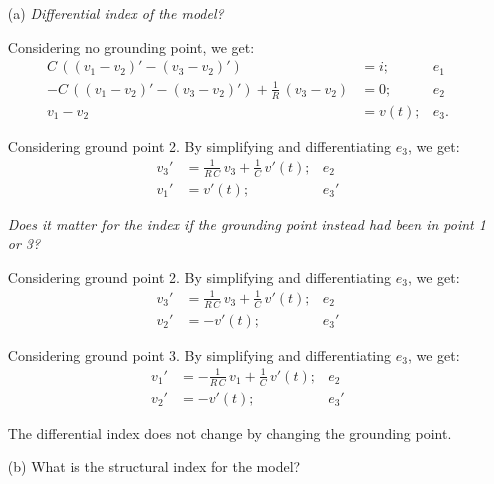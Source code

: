 \begin{enumerate}
	\item[(a)] \textit{Differential index of the model? }
	
	Considering no grounding point, we get:
	\begin{align*}
		C\,\left((v_1 - v_2)' - (v_3 - v_2)'\right) &= i;  & e_1\\
		-C\,\left((v_1 - v_2)' - (v_3 - v_2)'\right) + \frac{1}{R}\,(v_3 - v_2) &= 0;  & e_2\\
		v_1 - v_2 &= v(t);  & e_3.
	\end{align*}
	
	Considering ground point 2. By simplifying and differentiating $e_3$, we get:
	\begin{align*}
		v_3' &= \frac{1}{R\,C}\,v_3 + \frac{1}{C}\,v'(t); & e_2\\
		v_1' &= v'(t); & e_3'
	\end{align*}


	\textit{Does it matter for the index if the grounding point instead had been in point 1 or 3?} 
	
	Considering ground point 2. By simplifying and differentiating $e_3$, we get:
	\begin{align*}
		v_3' &= \frac{1}{R\,C}\,v_3 + \frac{1}{C}\,v'(t); & e_2\\
		v_2' &= -v'(t); & e_3'
	\end{align*}


	Considering ground point 3. By simplifying and differentiating $e_3$, we get:
	\begin{align*}
		v_1' &= -\frac{1}{R\,C}\,v_1 + \frac{1}{C}\,v'(t); & e_2\\
		v_2' &= -v'(t); & e_3'
	\end{align*}
	
	The differential index does not change by changing the grounding point.	

	\item[(b)] What is the structural index for the model?
	

\end{enumerate}
